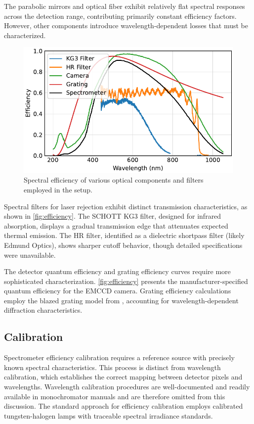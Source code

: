 \documentclass[
	parskip=half,
	a4paper,
]{scrarticle}
\begin{document}
The parabolic mirrors and optical fiber exhibit relatively flat spectral responses across the detection range, contributing primarily constant efficiency factors. However, other components introduce wavelength-dependent losses that must be characterized.

\begin{figure}
    \centering
    \includegraphics{../analysis/figures/filter.pdf}
    \caption{Spectral efficiency of various optical components and filters employed in the setup.}
    \label{fig:efficiency}
\end{figure}

Spectral filters for laser rejection exhibit distinct transmission characteristics, as shown in \autoref{fig:efficiency}. The SCHOTT KG3 filter, designed for infrared absorption, displays a gradual transmission edge that attenuates expected thermal emission. The HR filter, identified as a dielectric shortpass filter (likely Edmund Optics), shows sharper cutoff behavior, though detailed specifications were unavailable.

The detector quantum efficiency and grating efficiency curves require more sophisticated characterization. \autoref{fig:efficiency} presents the manufacturer-specified quantum efficiency for the EMCCD camera. Grating efficiency calculations employ the blazed grating model from \cite{barker_ripple_1984}, accounting for wavelength-dependent diffraction characteristics.

\subsection{Calibration}
Spectrometer efficiency calibration requires a reference source with precisely known spectral characteristics. This process is distinct from wavelength calibration, which establishes the correct mapping between detector pixels and wavelengths. Wavelength calibration procedures are well-documented and readily available in monochromator manuals and are therefore omitted from this discussion. The standard approach for efficiency calibration employs calibrated tungsten-halogen lamps with traceable spectral irradiance standards.
\end{document}

